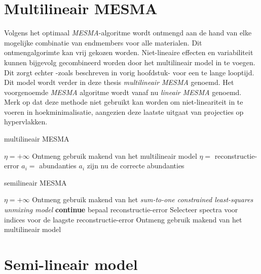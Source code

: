 \documentclass[12pt]{report}
\begin{document}
\section{Multilineair MESMA} \label{sec:mmesma}

Volgens het optimaal \textit{MESMA}-algoritme wordt ontmengd aan de hand van elke mogelijke combinatie van endmembers voor alle materialen. Dit ontmengalgorimte kan vrij gekozen worden. Niet-lineaire effecten en variabiliteit kunnen bijgevolg gecombineerd worden door het multilineair model in te voegen. Dit zorgt echter -zoals beschreven in vorig hoofdstuk- voor een te lange looptijd. Dit model wordt verder in deze thesis \textit{multilineair MESMA} genoemd. Het voorgenoemde \textit{MESMA} algoritme wordt vanaf nu \textit{lineair MESMA} genoemd. Merk op dat deze methode niet gebruikt kan worden om niet-lineariteit in te voeren in hoekminimalisatie, aangezien deze laatste uitgaat van projecties op hypervlakken.

\begin{algorithm}
\caption{multilineair MESMA\label{al:mmesma}}
\begin{algorithmic}[1]
\State $\eta = +\infty$ 
\State Ontmeng gebruik makend van het multilineair model
\State $\eta = $ reconstructie-error
\State $a_i = $ abundanties
\EndIf
\EndFor
\State $a_i$ zijn nu de correcte abundanties
\end{algorithmic}
\end{algorithm}

\begin{algorithm}
\caption{semilineair MESMA\label{al:smesma}}
\begin{algorithmic}[1]
\State $\eta = +\infty$ 
\State Ontmeng gebruik makend van het \textit{sum-to-one constrained least-squares unmixing model}
\State \textbf{continue}
\State bepaal reconstructie-error
\EndIf
\EndFor
\EndFor
\State Selecteer spectra voor indices voor de laagste reconstructie-error
\State Ontmeng gebruik makend van het multilineair model 
\end{algorithmic}
\end{algorithm}


\section{Semi-lineair model} \label{sec:smesma}
\end{document}

